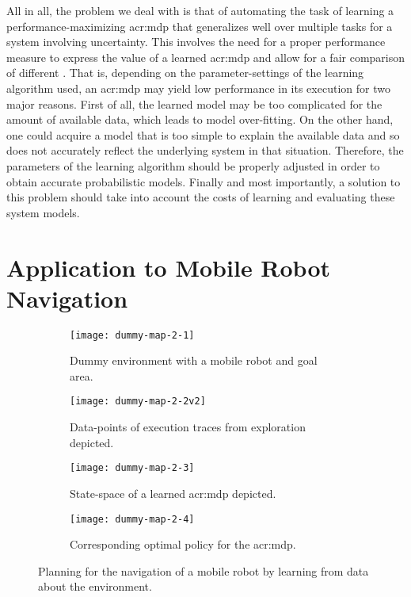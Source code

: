 All in all, the problem we deal with is that of automating the task of learning a performance-maximizing \acrshort{acr:mdp} that generalizes well over multiple tasks for a system involving uncertainty.
This involves the need for a proper performance measure to express the value of a learned \acrshort{acr:mdp} and allow for a fair comparison of different .
That is, depending on the parameter-settings of the learning algorithm used, an \acrshort{acr:mdp} may yield low performance in its execution for two major reasons.
First of all, the learned model may be too complicated for the amount of available data, which leads to model over-fitting.
On the other hand, one could acquire a model that is too simple to explain the available data and so does not accurately reflect the underlying system in that situation.
Therefore, the parameters of the learning algorithm should be properly adjusted in order to obtain accurate probabilistic models.
Finally and most importantly, a solution to this problem should take into account the costs of learning and evaluating these system models.

\section{Application to Mobile Robot Navigation}
\label{sec:application-mobile-robot}

\begin{figure}[t]
	\centering
	
	\captionsetup{font=small}
	\captionsetup[subfigure]{font=footnotesize}
	\captionsetup[subfigure]{justification=centering}
	\begin{subfigure}{.5\textwidth}
		\centering
		\texttt{[image: dummy-map-2-1]}
		\caption{Dummy environment with a mobile robot and goal area.}
		\label{fig:dummy-map-1}
	\end{subfigure}\hfill
	\begin{subfigure}{.5\textwidth}
		\centering
		\texttt{[image: dummy-map-2-2v2]}
		\caption{Data-points of execution traces from exploration depicted.}
		\label{fig:dummy-map-2}
	\end{subfigure}
	
	\bigskip
	
	\begin{subfigure}{.5\textwidth}
		\centering
		\texttt{[image: dummy-map-2-3]}
		\caption{State-space of a learned \acrshort{acr:mdp} depicted.}
		\label{fig:dummy-map-3}
	\end{subfigure}\hfill
	\begin{subfigure}{.5\textwidth}
		\centering
		\texttt{[image: dummy-map-2-4]}
		\caption{Corresponding optimal policy for the \acrshort{acr:mdp}.}
		\label{fig:dummy-map-4}
	\end{subfigure}
	\caption{Planning for the navigation of a mobile robot by learning  from data about the environment.}
\end{figure}

